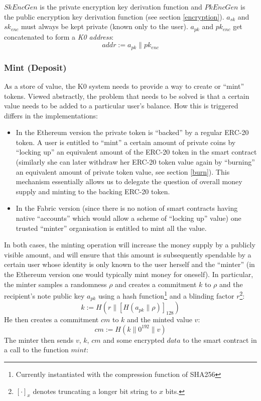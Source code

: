 \documentclass{article}
\newcommand{\conc}{\mathbin{\|}}
\begin{document}
$SkEncGen$ is the private encryption key derivation function and $PkEncGen$ is the public encryption key derivation function (see section \ref{encryption}).
$a_{sk}$ and $sk_{enc}$ must always be kept private (known only to the user). $a_{pk}$ and $pk_{enc}$ get concatenated to form a \textit{K0 address}:
$$addr := a_{pk} \conc pk_{enc}$$
\subsubsection{Mint (Deposit)} \label{mint}
As a store of value, the K0 system needs to provide a way to create or ``mint'' tokens. Viewed abstractly, the problem that needs to be solved is that a certain value needs to be added to a particular user's balance. How this is triggered differs in the implementations:
\begin{itemize}
    \item In the Ethereum version the private token is ``backed'' by a regular ERC-20 token. A user is entitled to ``mint'' a certain amount of private coins by ``locking up'' an equivalent amount of the ERC-20 token in the smart contract (similarly she can later withdraw her ERC-20 token value again by ``burning'' an equivalent amount of private token value, see section \ref{burn}). This mechanism essentially allows us to delegate the question of overall money supply and minting to the backing ERC-20 token.
    \item In the Fabric version (since there is no notion of smart contracts having native ``accounts'' which would allow a scheme of ``locking up'' value) one trusted ``minter'' organisation is entitled to mint all the value.
\end{itemize}
In both cases, the minting operation will increase the money supply by a publicly visible amount, and will ensure that this amount is subsequently spendable by a certain user whose identity is only known to the user herself and the ``minter'' (in the Ethereum version one would typically mint money for oneself). In particular, the minter samples a randomness $\rho$ and creates a commitment $k$ to $\rho$ and the recipient's note public key $a_{pk}$ using a hash function\footnote{Currently instantiated with the compression function of SHA256} and a blinding factor $r$\footnote{$[\cdot]_x$ denotes truncating a longer bit string to $x$ bits.}:
\[ k := H(r \conc [H(a_{pk} \conc \rho)]_{128}) \]
He then creates a commitment $cm$ to $k$ and the minted value $v$:
\[ cm := H(k \conc 0^{192} \conc v) \]
The minter then sends $v$, $k$, $cm$ and some encrypted $data$ to the smart contract in a call to the function $mint$:
\end{document}
